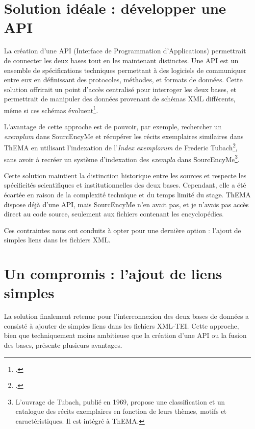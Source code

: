\section{Solution idéale : développer une API}
La création d'une API (Interface de Programmation d'Applications) permettrait de connecter les deux bases tout en les maintenant distinctes. Une API est un ensemble de spécifications techniques permettant à des logiciels de communiquer entre eux en définissant des protocoles, méthodes, et formats de données. Cette solution offrirait un point d'accès centralisé pour interroger les deux bases, et permettrait de manipuler des données provenant de schémas XML différents, même si ces schémas évoluent\footcite{pedroBuildingAPIProduct2024}.

L'avantage de cette approche est de pouvoir, par exemple, rechercher un \textit{exemplum} dans SourcEncyMe et récupérer les récits exemplaires similaires dans ThEMA en utilisant l'indexation de l'\textit{Index exemplorum} de Frederic Tubach\footcite{tubachIndexExemplorumHandbook1969}, sans avoir à recréer un système d'indexation des \textit{exempla} dans SourcEncyMe\footnote{L'ouvrage de Tubach, publié en 1969, propose une classification et un catalogue des récits exemplaires en fonction de leurs thèmes, motifs et caractéristiques. Il est intégré à ThEMA.}.

Cette solution maintient la distinction historique entre les sources et respecte les spécificités scientifiques et institutionnelles des deux bases. Cependant, elle a été écartée en raison de la complexité technique et du temps limité du stage. ThEMA dispose déjà d'une API, mais SourcEncyMe n'en avait pas, et je n'avais pas accès direct au code source, seulement aux fichiers contenant les encyclopédies.

Ces contraintes nous ont conduits à opter pour une dernière option : l'ajout de simples liens dans les fichiers XML.


\section{Un compromis : l'ajout de liens simples}
La solution finalement retenue pour l'interconnexion des deux bases de données a consisté à ajouter de simples liens dans les fichiers XML-TEI. Cette approche, bien que techniquement moins ambitieuse que la création d'une API ou la fusion des bases, présente plusieurs avantages.

